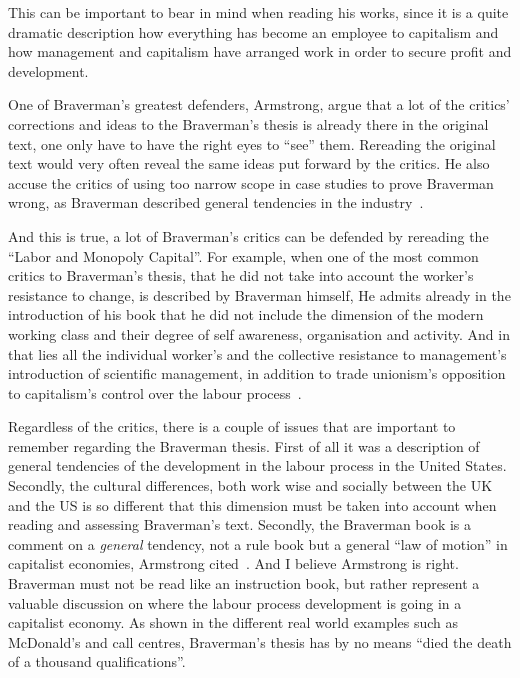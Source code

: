 \documentclass[a4paper,12pt,titlepage]{article}
\begin{document}
  This can be important to bear in mind when reading his works,
  since it is a quite dramatic description how everything has
  become an employee to capitalism and how management and capitalism
  have arranged work in order to secure profit and development.

  One of Braverman's greatest defenders, Armstrong, argue that
  a lot of the critics' corrections and ideas to the Braverman's thesis
  is already there in the original text, one only have to have the right
  eyes to ``see'' them. Rereading the original text would
  very often reveal the same ideas put forward by the critics.
  He also accuse the critics of using too narrow scope in
  case studies to prove Braverman wrong,
  as Braverman described general tendencies in the industry~\cite[45]{ptcs}.

  And this is true, a lot of Braverman's critics
  can be defended by rereading the ``Labor and Monopoly Capital''.
  For example, when one of the most common
  critics to Braverman's thesis, that he did not take into account the worker's
  resistance to change, is described by Braverman himself,
  He admits already in the introduction of his book that he did not
  include the dimension of the modern working class and
  their degree of self awareness, organisation and activity. And
  in that lies all the individual worker's and the collective
  resistance to management's introduction of scientific management,
  in addition to trade unionism's opposition to capitalism's control
  over the labour process~\cite[26-27]{hb}.

  Regardless of the critics, there is a couple
  of issues that are important to remember regarding the Braverman
  thesis. First of all it was a description of general tendencies
  of the development in the labour process in the United States.
  Secondly, the cultural differences, both work wise and socially between
  the UK and the US is so different that this dimension must
  be taken into account when reading and assessing Braverman's text.
  Secondly, the Braverman book is a comment on a \emph{general}
  tendency, not a rule book but a general ``law of motion''
  in capitalist economies, Armstrong cited~\cite[156]{mnpb}.
  And I believe Armstrong is right. Braverman must not be
  read like an instruction book, but rather represent a
  valuable discussion on where the labour process development
  is going in a capitalist economy. As shown in the different
  real world examples such as McDonald's and call centres,
  Braverman's thesis has by no means
  ``died the death of a thousand qualifications''.
  

  \newpage
  \setlength{\baselineskip}{1.3em}
  
  
  \nocite{*}
\end{document}

